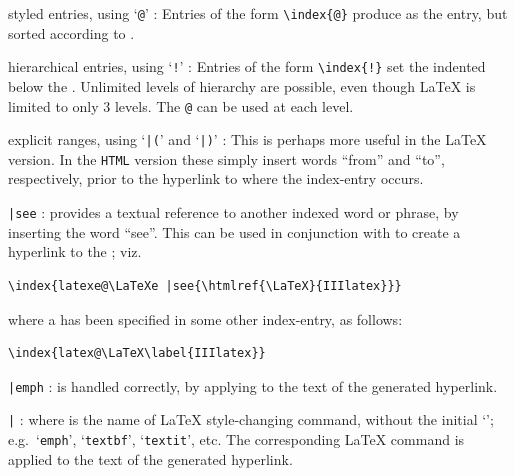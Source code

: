 \begin{htmllist}%
%
\item 
[styled entries, using `\texttt{@}' : ]
Entries of the form \verb|\index{|\verb|@|\verb|}|
produce  as the entry, but sorted according to .

%
\item 
[hierarchical entries, using `\texttt{!}' : ] 
Entries of the form
\verb|\index{|\verb|!|\verb|}|
set the  indented below the .
Unlimited levels of hierarchy are possible, 
even though \LaTeX{} is limited to only 3 levels. 
The \verb|@| can be used at each level.

%
\item 
[explicit ranges, using `\texttt{|(}' and `\texttt{|)}' : ]
This is perhaps more useful in the \LaTeX{} version. 
In the \texttt{HTML} version these simply insert words ``from'' and ``to'',
respectively, prior to the hyperlink to where the index-entry occurs.

%
%
\item 
[\texttt{|see\char123}\Meta{index-entry}\texttt{\char125} : ]
provides a textual reference to another indexed word or phrase, 
by inserting the word ``see''. 
This can be used in conjunction with  to create a hyperlink
to the ; viz.
\begin{verbatim}
\index{latexe@\LaTeXe |see{\htmlref{\LaTeX}{IIIlatex}}}
\end{verbatim}
where a  has been specified in some other index-entry, as follows:
\begin{verbatim}
\index{latex@\LaTeX\label{IIIlatex}}
\end{verbatim}

%
\item [\texttt{|emph} : ]
 is handled correctly, by applying
 to the text of the generated hyperlink.

%
\item [\texttt{|}\Meta{style} : ]
where  is the name of \LaTeX{} style-changing command, 
without the initial `\Lc{}'; e.g.\ `\texttt{emph}', `\texttt{textbf}',
`\texttt{textit}', etc. The corresponding \LaTeX{} command is applied
to the text of the generated hyperlink.


\end{htmllist}
